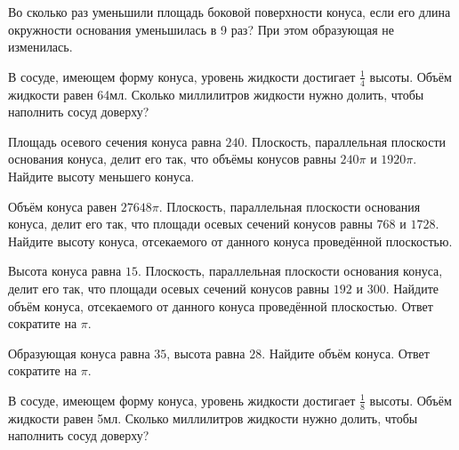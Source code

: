 \documentclass[a4paper]{article}
\begin{document}
\begin{taskBN}{1}
Во сколько раз уменьшили площадь боковой поверхности конуса, если его длина окружности основания уменьшилась в 9 раз? При этом образующая не изменилась.
\end{taskBN}

\begin{taskBN}{2}
В сосуде, имеющем форму конуса, уровень жидкости достигает $\frac{1}{4}$ высоты. Объём жидкости равен 64мл. Сколько миллилитров жидкости нужно долить, чтобы наполнить сосуд доверху?
\end{taskBN}

\begin{taskBN}{3}
Площадь осевого сечения конуса равна $240$. Плоскость, параллельная плоскости основания конуса,  делит его так, что объёмы конусов равны $240\pi$ и $1920\pi$. Найдите высоту меньшего конуса. 
\end{taskBN}

\begin{taskBN}{4}
Объём конуса равен $27648\pi$. Плоскость, параллельная плоскости основания конуса,  делит его так, что площади осевых сечений конусов равны $768$ и $1728$. Найдите высоту конуса, отсекаемого от данного конуса проведённой плоскостью. 
\end{taskBN}

\begin{taskBN}{5}
Высота конуса равна $15$. Плоскость, параллельная плоскости основания конуса,  делит его так, что площади осевых сечений конусов равны $192$ и $300$. Найдите объём конуса, отсекаемого от данного конуса проведённой плоскостью. Ответ сократите на $\pi$.
\end{taskBN}

\begin{taskBN}{6}
Образующая конуса равна $35$, высота равна $28$. Найдите объём конуса. Ответ сократите на $\pi$.
\end{taskBN}

\begin{taskBN}{7}
В сосуде, имеющем форму конуса, уровень жидкости достигает $\frac{1}{8}$ высоты. Объём жидкости равен 5мл. Сколько миллилитров жидкости нужно долить, чтобы наполнить сосуд доверху?
\end{taskBN}
\end{document}
